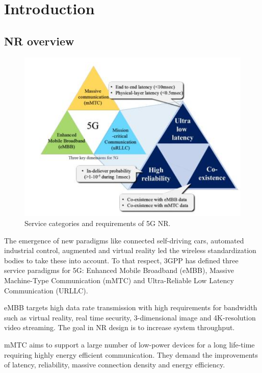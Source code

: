 \documentclass{report}
\begin{document}
\thispagestyle{fancy}
\tableofcontents{}
\clearpage

\chapter{Introduction}
\section{NR overview}
\begin{figure}[htbp]
\centerline{\includegraphics[scale=0.35]{fig29.PNG}}
\caption{Service categories and requirements of 5G NR.}
\label{fig29}
\end{figure}

The emergence of new paradigms like connected self-driving cars, automated industrial control, augmented and virtual reality led the wireless standardization bodies to take these into account. To that respect, 3GPP has defined three service paradigms for 5G: Enhanced Mobile Broadband (eMBB), Massive Machine-Type Communication (mMTC) and Ultra-Reliable Low Latency Communication (URLLC).

eMBB targets high data rate transmission with high requirements for bandwidth such as virtual reality, real time security, 3-dimensional image and 4K-resolution video streaming. The goal in NR design is to increase system throughput.

mMTC aims to support a large number of low-power devices for a long life-time requiring highly energy efficient communication. They demand the improvements of latency, reliability, massive connection density and energy efficiency. 
 
\end{document}
